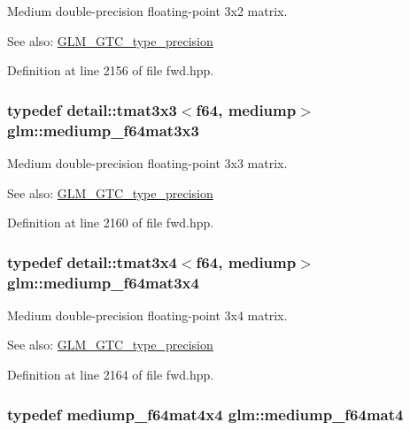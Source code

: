Medium double-precision floating-point 3x2 matrix. \begin{Desc}
\item[See also:]\hyperlink{group__gtc__type__precision}{GLM\_\-GTC\_\-type\_\-precision} \end{Desc}


Definition at line 2156 of file fwd.hpp.\hypertarget{group__gtc__type__precision_g871b69a221dae7461aa746e6e6d372fc}{
\subsubsection[mediump\_\-f64mat3x3]{\setlength{\rightskip}{0pt plus 5cm}typedef detail::tmat3x3$<$f64, mediump$>$ {\bf glm::mediump\_\-f64mat3x3}}}
\label{group__gtc__type__precision_g871b69a221dae7461aa746e6e6d372fc}


Medium double-precision floating-point 3x3 matrix. \begin{Desc}
\item[See also:]\hyperlink{group__gtc__type__precision}{GLM\_\-GTC\_\-type\_\-precision} \end{Desc}


Definition at line 2160 of file fwd.hpp.\hypertarget{group__gtc__type__precision_gc3b0ca6d79631a2480cee8897dcd79ec}{
\subsubsection[mediump\_\-f64mat3x4]{\setlength{\rightskip}{0pt plus 5cm}typedef detail::tmat3x4$<$f64, mediump$>$ {\bf glm::mediump\_\-f64mat3x4}}}
\label{group__gtc__type__precision_gc3b0ca6d79631a2480cee8897dcd79ec}


Medium double-precision floating-point 3x4 matrix. \begin{Desc}
\item[See also:]\hyperlink{group__gtc__type__precision}{GLM\_\-GTC\_\-type\_\-precision} \end{Desc}


Definition at line 2164 of file fwd.hpp.\hypertarget{group__gtc__type__precision_g2763f655bfe2141a014e66d26a9d2f18}{
\subsubsection[mediump\_\-f64mat4]{\setlength{\rightskip}{0pt plus 5cm}typedef mediump\_\-f64mat4x4 {\bf glm::mediump\_\-f64mat4}}}
\label{group__gtc__type__precision_g2763f655bfe2141a014e66d26a9d2f18}



